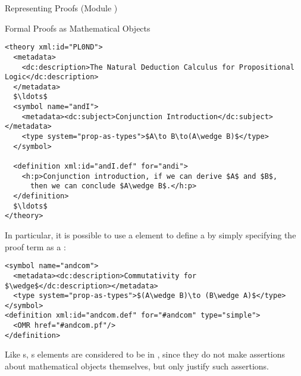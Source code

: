 \begin{omgroup}[id=proofs,short=Representing Proofs]{Representing Proofs (Module {})}
\begin{module}[id=proofobjects]
\begin{omgroup}[id=proofobjects]{Formal Proofs as Mathematical Objects}
\begin{lstlisting}[label=lst:plnd,mathescape,
  caption={A Theory for Propositional Natural Deduction}]
<theory xml:id="PL0ND">
  <metadata>
    <dc:description>The Natural Deduction Calculus for Propositional Logic</dc:description>
  </metadata>
  $\ldots$
  <symbol name="andI">
    <metadata><dc:subject>Conjunction Introduction</dc:subject></metadata>
    <type system="prop-as-types">$A\to B\to(A\wedge B)$</type>
  </symbol>

  <definition xml:id="andI.def" for="andi">
    <h:p>Conjunction introduction, if we can derive $A$ and $B$, 
      then we can conclude $A\wedge B$.</h:p>
  </definition>
  $\ldots$
</theory>
\end{lstlisting}

In particular, it is possible to use a 
element to define a {} by simply specifying the proof
term as a {}:
\begin{lstlisting}[mathescape]
<symbol name="andcom">
  <metadata><dc:description>Commutativity for $\wedge$</dc:description></metadata>
  <type system="prop-as-types">$(A\wedge B)\to (B\wedge A)$</type>
</symbol>
<definition xml:id="andcom.def" for="#andcom" type="simple">
  <OMR href="#andcom.pf"/>
</definition>
\end{lstlisting}
Like {s}, {s} elements are considered to be
 in \omdoc, since they do not make
assertions about mathematical objects themselves, but only justify such assertions.
\end{omgroup}
\end{module}
\end{omgroup}


